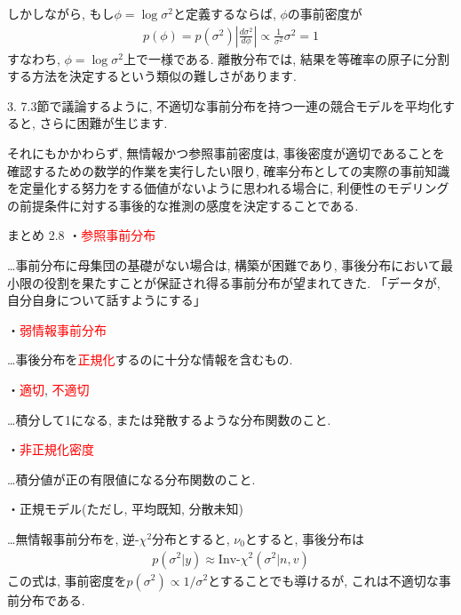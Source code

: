 \documentclass[10pt,dvipdfmx,a4]{beamer}
\newcommand{\eqn}[1]{\begin{align*}#1\end{align*}}
\newcommand{\tcr}[1]{\textcolor{red}{#1}}
\begin{document}
\begin{frame}
しかしながら, もし$\phi=\log \sigma^2$と定義するならば, $\phi$の事前密度が
\eqn{p(\phi)=p(\sigma^2)\left| \frac{d\sigma^2}{d\phi}\right| \propto \frac{1}{\sigma^2}\sigma^2=1}
すなわち, $\phi=\log \sigma^2$上で一様である.
離散分布では, 結果を等確率の原子に分割する方法を決定するという類似の難しさがあります.

3. 7.3節で議論するように, 不適切な事前分布を持つ一連の競合モデルを平均化すると, さらに困難が生じます.

それにもかかわらず, 無情報かつ参照事前密度は, 事後密度が適切であることを確認するための数学的作業を実行したい限り, 確率分布としての実際の事前知識を定量化する努力をする価値がないように思われる場合に, 利便性のモデリングの前提条件に対する事後的な推測の感度を決定することである.
\end{frame}


\begin{frame}[t]{まとめ 2.8}
・\tcr{参照事前分布}

…事前分布に母集団の基礎がない場合は, 構築が困難であり, 事後分布において最小限の役割を果たすことが保証され得る事前分布が望まれてきた.
「データが, 自分自身について話すようにする」

・\tcr{弱情報事前分布}

…事後分布を\tcr{正規化}するのに十分な情報を含むもの.

・\tcr{適切}, \tcr{不適切}

…積分して1になる, または発散するような分布関数のこと.

・\tcr{非正規化密度}

…積分値が正の有限値になる分布関数のこと.

・正規モデル(ただし, 平均既知, 分散未知)

…無情報事前分布を, 逆-$\chi^2$分布とすると, $\nu_0$とすると, 事後分布は
\eqn{p(\sigma^2|y)\approx \text{Inv-}\chi^2(\sigma^2|n,v)}
この式は, 事前密度を$p(\sigma^2)\propto 1/\sigma^2$とすることでも導けるが, これは不適切な事前分布である.
\end{frame}

\end{document}
